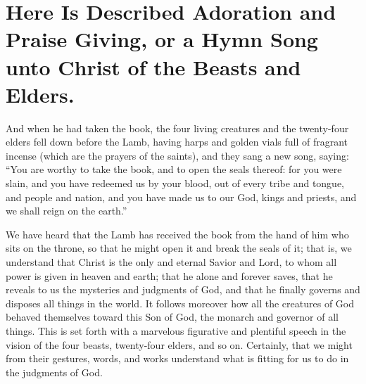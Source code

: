 \chapter[Sermon 28. Here Is Described Adoration and Praise Giving, or a Hymn Song unto Christ of the Beasts and Elders.]{Here Is Described Adoration and Praise Giving, or a Hymn Song unto Christ of the Beasts and Elders.}
\label{sermon:028}

And when he had taken the book, the four living creatures and the twenty-four elders fell down before the Lamb, having harps and golden vials full of fragrant incense (which are the prayers of the saints), and they sang a new song, saying: “You are worthy to take the book, and to open the seals thereof: for you were slain, and you have redeemed us by your blood, out of every tribe and tongue, and people and nation, and you have made us to our God, kings and priests, and we shall reign on the earth.”

We have heard that the Lamb has received the book from the hand of him who sits on the throne, so that he might open it and break the seals of it; that is, we understand that Christ is the only and eternal Savior and Lord, to whom all power is given in heaven and earth; that he alone and forever saves, that he reveals to us the mysteries and judgments of God, and that he finally governs and disposes all things in the world. It follows moreover how all the creatures of God behaved themselves toward this Son of God, the monarch and governor of all things. This is set forth with a marvelous figurative and plentiful speech in the vision of the four beasts, twenty-four elders, and so on. Certainly, that we might from their gestures, words, and works understand what is fitting for us to do in the judgments of God.

